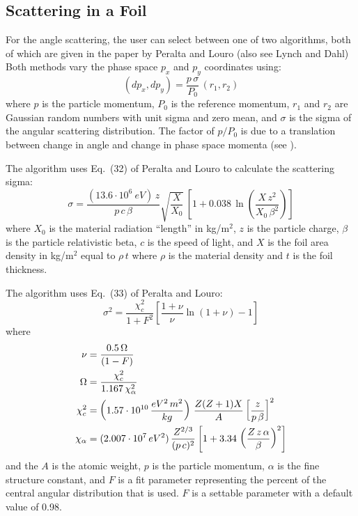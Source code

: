 \subsection{Scattering in a Foil}
\label{s:foil.scatter}

For the angle scattering, the user can select between one of two algorithms, both
of which are given in the paper by Peralta and Louro\cite{b:peralta} (also see Lynch and Dahl\cite{b:lynch})
Both methods vary the phase space $p_x$ and $p_y$ coordinates using:
\begin{equation}
  (dp_x, dp_y) = \frac{p \, \sigma}{P_0} \, (r_1, r_2)
  \label{dpr1s}
\end{equation}
where $p$ is the
particle momentum, $P_0$ is the reference momentum, $r_1$ and $r_2$ are Gaussian random numbers with
unit sigma and zero mean, and $\sigma$ is the sigma of the angular scattering distribution. The
factor of $p/P_0$ is due to a translation between change in angle and change in phase space momenta
(see ). 

The  algorithm uses Eq.~(32) of Peralta and Louro\cite{b:peralta} to calculate the
scattering sigma:
\begin{equation}
  \sigma = \frac{(13.6 \cdot 10^6~eV) \, z}{p \, c \, \beta} \sqrt{\frac{X}{X_0}} \, \left[
  1 + 0.038 \, \ln \left( \frac{X \, z^2}{X_0 \, \beta^2} \right) \right]
  \label{sszpb}
\end{equation}
where $X_0$ is the material radiation ``length'' in kg/m$^2$, $z$ is the particle charge, $\beta$ is the particle
relativistic beta, $c$ is the speed of light, and $X$ is the foil area density in kg/m$^2$ equal
to $\rho \, t$ where $\rho$ is the material density and $t$ is the foil thickness.

The  algorithm uses Eq.~(33) of Peralta and Louro:
\begin{equation}
  \sigma^2 = \frac{\chi_c^2}{1 + F^2} \left[ \frac{1 + \nu}{\nu} \ln (1 + \nu) - 1 \right]
  \label{sc1f}
\end{equation}
where
\begin{align}
  \nu &= \frac{0.5 \, \Omega}{(1 - F)} \nonumber \\
  \Omega &= \frac{\chi_c^2}{1.167 \, \chi_\alpha^2} \nonumber \\
  \chi_c^2 &= \left( 1.57 \cdot 10^{10} \, \frac{eV^2 \, m^2}{kg} \right) \, 
    \frac{Z (Z+1) X}{A} \left[ \frac{z}{p \, \beta} \right]^2 
  \label{no1f} \\
  \chi_\alpha &= (2.007 \cdot 10^7 \, eV^2) \, \frac{Z^{2/3}}{(p \, c)^2} 
            \left[1 + 3.34 \,  \left( \frac{Z \, z \, \alpha}{\beta} \right)^2 \right] \nonumber
\end{align}
and the $A$ is the atomic weight, $p$ is the particle momentum, $\alpha$ is the fine structure
constant, and $F$ is a fit parameter representing the percent of the central angular distribution
that is used.  $F$ is a settable parameter with a default value of 0.98.

